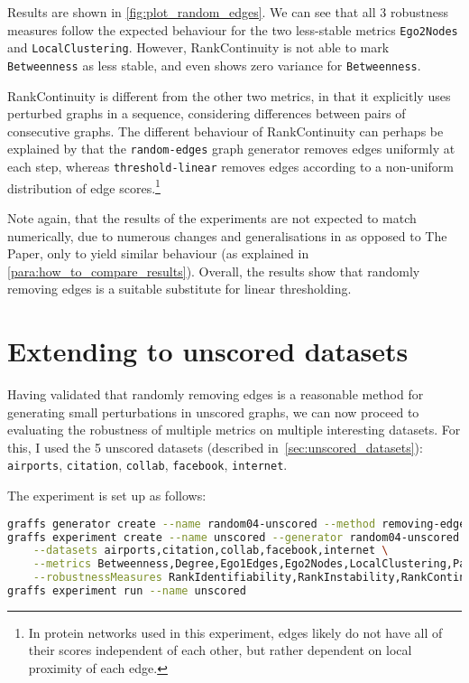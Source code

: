 

Results are shown in \autoref{fig:plot_random_edges}.
We can see that all 3 robustness measures follow the expected behaviour for the two less-stable metrics \texttt{Ego2Nodes} and \texttt{LocalClustering}.
However, RankContinuity is not able to mark \texttt{Betweenness} as less stable, and even shows zero variance for \texttt{Betweenness}.

RankContinuity is different from the other two metrics, in that it explicitly uses perturbed graphs in a sequence, considering differences between pairs of consecutive graphs.
The different behaviour of RankContinuity can perhaps be explained by that the \texttt{random-edges} graph generator removes edges uniformly at each step, whereas \texttt{threshold-linear} removes edges according to a non-uniform distribution of edge scores.\footnote{In protein networks used in this experiment, edges likely do not have all of their scores independent of each other, but rather dependent on local proximity of each edge.}

Note again, that the results of the experiments are not expected to match numerically, due to numerous changes and generalisations in \graffs as opposed to The Paper, only to yield similar behaviour (as explained in \autoref{para:how_to_compare_results}).
Overall, the results show that randomly removing edges is a suitable substitute for linear thresholding.


\section{Extending to unscored datasets}

Having validated that randomly removing edges is a reasonable method for generating small perturbations in unscored graphs, we can now proceed to evaluating the  robustness of multiple metrics on multiple interesting datasets.
For this, I used the 5 unscored datasets (described in~\autoref{sec:unscored_datasets}): \texttt{airports}, \texttt{citation}, \texttt{collab}, \texttt{facebook}, \texttt{internet}.

The experiment is set up as follows:
\begin{lstlisting}[language=bash]
graffs generator create --name random04-unscored --method removing-edges --params 0.04 -n 31 --seed 7
graffs experiment create --name unscored --generator random04-unscored \
    --datasets airports,citation,collab,facebook,internet \
    --metrics Betweenness,Degree,Ego1Edges,Ego2Nodes,LocalClustering,PageRank,Redundancy \
    --robustnessMeasures RankIdentifiability,RankInstability,RankContinuity
graffs experiment run --name unscored
\end{lstlisting}

